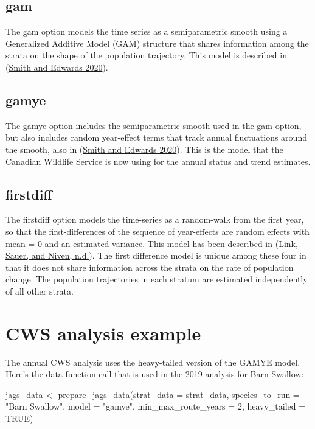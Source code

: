 \documentclass[
]{book}
\newenvironment{Shaded}{\begin{snugshade}}{\end{snugshade}}
\newcommand{\AttributeTok}[1]{\textcolor[rgb]{0.77,0.63,0.00}{#1}}
\newcommand{\ConstantTok}[1]{\textcolor[rgb]{0.00,0.00,0.00}{#1}}
\newcommand{\DecValTok}[1]{\textcolor[rgb]{0.00,0.00,0.81}{#1}}
\newcommand{\FunctionTok}[1]{\textcolor[rgb]{0.00,0.00,0.00}{#1}}
\newcommand{\NormalTok}[1]{#1}
\newcommand{\OtherTok}[1]{\textcolor[rgb]{0.56,0.35,0.01}{#1}}
\newcommand{\StringTok}[1]{\textcolor[rgb]{0.31,0.60,0.02}{#1}}
\begin{document}
\hypertarget{gam}{%
\subsection{gam}\label{gam}}

The gam option models the time series as a semiparametric smooth using a Generalized Additive Model (GAM) structure that shares information among the strata on the shape of the population trajectory. This model is described in (\protect\hyperlink{ref-smith2020a}{Smith and Edwards 2020}).

\hypertarget{gamye}{%
\subsection{gamye}\label{gamye}}

The gamye option includes the semiparametric smooth used in the gam option, but also includes random year-effect terms that track annual fluctuations around the smooth, also in (\protect\hyperlink{ref-smith2020a}{Smith and Edwards 2020}). This is the model that the Canadian Wildlife Service is now using for the annual status and trend estimates.

\hypertarget{firstdiff}{%
\subsection{firstdiff}\label{firstdiff}}

The firstdiff option models the time-series as a random-walk from the first year, so that the first-differences of the sequence of year-effects are random effects with mean = 0 and an estimated variance. This model has been described in (\protect\hyperlink{ref-link}{Link, Sauer, and Niven, n.d.}). The first difference model is unique among these four in that it does not share information across the strata on the rate of population change. The population trajectories in each stratum are estimated independently of all other strata.

\hypertarget{cws-analysis-example}{%
\section{CWS analysis example}\label{cws-analysis-example}}

The annual CWS analysis uses the heavy-tailed version of the GAMYE model. Here's the data function call that is used in the 2019 analysis for Barn Swallow:

\begin{Shaded}
\begin{Highlighting}[]
\NormalTok{jags\_data }\OtherTok{\textless{}{-}} \FunctionTok{prepare\_jags\_data}\NormalTok{(}\AttributeTok{strat\_data =}\NormalTok{ strat\_data,}
                  \AttributeTok{species\_to\_run =} \StringTok{"Barn Swallow"}\NormalTok{,}
                  \AttributeTok{model =} \StringTok{"gamye"}\NormalTok{,}
                  \AttributeTok{min\_max\_route\_years =} \DecValTok{2}\NormalTok{,}
                  \AttributeTok{heavy\_tailed =} \ConstantTok{TRUE}\NormalTok{)}
\end{Highlighting}
\end{Shaded}
\end{document}
